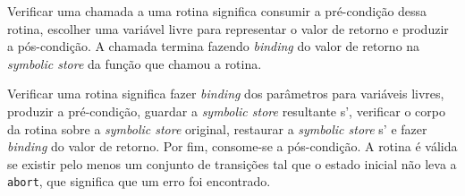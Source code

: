 Verificar uma chamada a uma rotina significa consumir a pré-condição dessa rotina, escolher uma variável livre para representar o valor de retorno e produzir a pós-condição. A chamada termina fazendo \textit{binding} do valor de retorno na \textit{symbolic store} da função que chamou a rotina.

Verificar uma rotina significa fazer \textit{binding} dos parâmetros para variáveis livres, produzir a pré-condição, guardar a \emph{symbolic store} resultante s', verificar o corpo da rotina sobre a \textit{symbolic store} original, restaurar a \textit{symbolic store} s' e fazer \textit{binding} do valor de retorno. Por fim, consome-se a pós-condição. A rotina é válida se existir pelo menos um conjunto de transições tal que o estado inicial não leva a \texttt{abort}, que significa que um erro foi encontrado.
